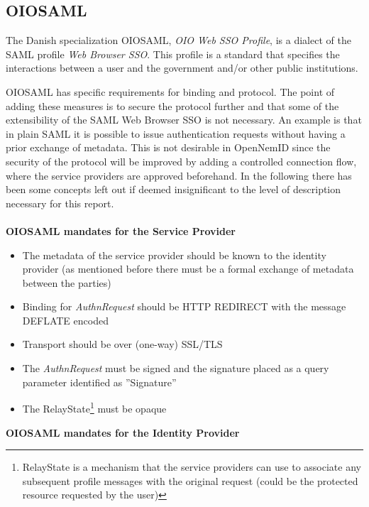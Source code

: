\documentclass[twosided]{report}
\begin{document}
\subsection{OIOSAML}
The Danish specialization OIOSAML, \emph{OIO Web SSO Profile}, is a dialect of the SAML profile \emph{Web Browser SSO}. This profile is a standard that specifies the interactions between a user and the government and/or other public institutions.
\par
OIOSAML has specific requirements for binding and protocol. The point of adding these measures is to secure the protocol further and that some of the extensibility of the SAML Web Browser SSO is not necessary. An example is that in plain SAML it is possible to issue authentication requests without having a prior exchange of metadata. This is not desirable in OpenNemID since the security of the protocol will be improved by adding a controlled connection flow, where the service providers are approved beforehand. In the following there has been some concepts left out if deemed insignificant to the level of description necessary for this report.\\\\
\textbf{OIOSAML mandates for the Service Provider}
\begin{itemize}
  \item The metadata of the service provider should be known to the identity provider (as mentioned before there must be a formal exchange of metadata between the parties)
  \item Binding for \emph{AuthnRequest} should be HTTP REDIRECT with the message DEFLATE encoded
  \item Transport should be over (one-way) SSL/TLS
  \item The \emph{AuthnRequest} must be signed and the signature placed as a query parameter identified as ''Signature''
  \item The RelayState\footnote{RelayState is a mechanism that the service providers can use to associate any subsequent profile messages with the original request (could be the protected resource requested by the user)} must be opaque
\end{itemize}
\textbf{OIOSAML mandates for the Identity Provider}
\end{document}
